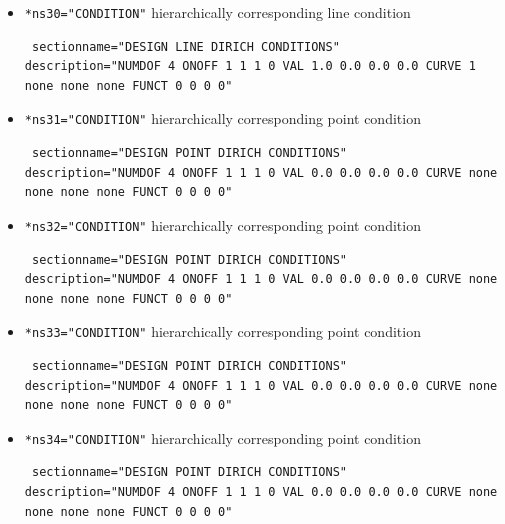 \begin{itemize}
\item \verb|*ns30="CONDITION"| \qquad hierarchically corresponding line condition
\begin{small} \begin{verbatim} sectionname="DESIGN LINE DIRICH CONDITIONS"
description="NUMDOF 4 ONOFF 1 1 1 0 VAL 1.0 0.0 0.0 0.0 CURVE 1 none none none FUNCT 0 0 0 0"
\end{verbatim} \end{small}

\item \verb|*ns31="CONDITION"| \qquad hierarchically corresponding point condition
\begin{small} \begin{verbatim} sectionname="DESIGN POINT DIRICH CONDITIONS"
description="NUMDOF 4 ONOFF 1 1 1 0 VAL 0.0 0.0 0.0 0.0 CURVE none none none none FUNCT 0 0 0 0"
\end{verbatim} \end{small}

 \item \verb|*ns32="CONDITION"| \qquad hierarchically corresponding point condition
\begin{small} \begin{verbatim} sectionname="DESIGN POINT DIRICH CONDITIONS"
description="NUMDOF 4 ONOFF 1 1 1 0 VAL 0.0 0.0 0.0 0.0 CURVE none none none none FUNCT 0 0 0 0"
\end{verbatim} \end{small}

 \item \verb|*ns33="CONDITION"| \qquad hierarchically corresponding point condition
\begin{small} \begin{verbatim} sectionname="DESIGN POINT DIRICH CONDITIONS"
description="NUMDOF 4 ONOFF 1 1 1 0 VAL 0.0 0.0 0.0 0.0 CURVE none none none none FUNCT 0 0 0 0"
\end{verbatim} \end{small} 

\item \verb|*ns34="CONDITION"| \qquad hierarchically corresponding point condition
\begin{small} \begin{verbatim} sectionname="DESIGN POINT DIRICH CONDITIONS"
description="NUMDOF 4 ONOFF 1 1 1 0 VAL 0.0 0.0 0.0 0.0 CURVE none none none none FUNCT 0 0 0 0"
\end{verbatim} \end{small}


\end{itemize}
